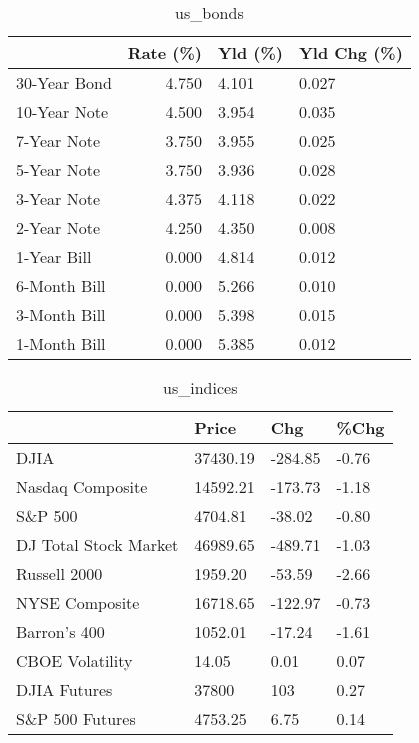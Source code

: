 \documentclass{article}%
\begin{document}
%


\begin{table}[htbp]%
\caption{us\_bonds}%
\centering%
\begin{adjustbox}{width=1\textwidth}%
\begin{tabular}{lrll}
\toprule
             &  Rate (\%) & Yld (\%) & Yld Chg (\%) \\
\midrule
30-Year Bond &     4.750 &   4.101 &       0.027 \\
10-Year Note &     4.500 &   3.954 &       0.035 \\
 7-Year Note &     3.750 &   3.955 &       0.025 \\
 5-Year Note &     3.750 &   3.936 &       0.028 \\
 3-Year Note &     4.375 &   4.118 &       0.022 \\
 2-Year Note &     4.250 &   4.350 &       0.008 \\
 1-Year Bill &     0.000 &   4.814 &       0.012 \\
6-Month Bill &     0.000 &   5.266 &       0.010 \\
3-Month Bill &     0.000 &   5.398 &       0.015 \\
1-Month Bill &     0.000 &   5.385 &       0.012 \\
\bottomrule
\end{tabular}
%
\end{adjustbox}%
\end{table}

%


\begin{table}[htbp]%
\caption{us\_indices}%
\centering%
\begin{adjustbox}{width=1\textwidth}%
\begin{tabular}{llll}
\toprule
                      &    Price &     Chg &  \%Chg \\
\midrule
                 DJIA & 37430.19 & -284.85 & -0.76 \\
     Nasdaq Composite & 14592.21 & -173.73 & -1.18 \\
              S\&P 500 &  4704.81 &  -38.02 & -0.80 \\
DJ Total Stock Market & 46989.65 & -489.71 & -1.03 \\
         Russell 2000 &  1959.20 &  -53.59 & -2.66 \\
       NYSE Composite & 16718.65 & -122.97 & -0.73 \\
         Barron's 400 &  1052.01 &  -17.24 & -1.61 \\
      CBOE Volatility &    14.05 &    0.01 &  0.07 \\
         DJIA Futures &    37800 &     103 &  0.27 \\
      S\&P 500 Futures &  4753.25 &    6.75 &  0.14 \\
\bottomrule
\end{tabular}
%
\end{adjustbox}%
\end{table}
\end{document}
